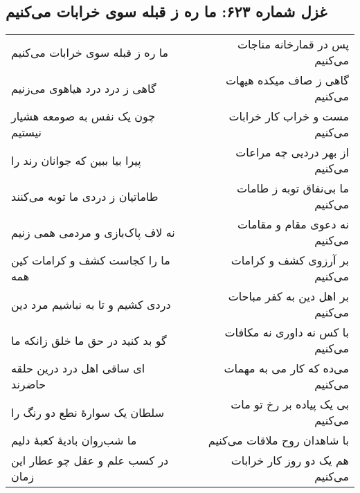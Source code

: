 \begin{center}
\section*{غزل شماره ۶۲۳: ما ره ز قبله سوی خرابات می‌کنیم}
\label{sec:623}
\begin{longtable}{l p{0.5cm} r}
ما ره ز قبله سوی خرابات می‌کنیم
&&
پس در قمارخانه مناجات می‌کنیم
\\
گاهی ز درد درد هیاهوی می‌زنیم
&&
گاهی ز صاف میکده هیهات می‌کنیم
\\
چون یک نفس به صومعه هشیار نیستیم
&&
مست و خراب کار خرابات می‌کنیم
\\
پیرا بیا ببین که جوانان رند را
&&
از بهر دردیی چه مراعات می‌کنیم
\\
طاماتیان ز دردی ما توبه می‌کنند
&&
ما بی‌نفاق توبه ز طامات می‌کنیم
\\
نه لاف پاک‌بازی و مردمی همی زنیم
&&
نه دعوی مقام و مقامات می‌کنیم
\\
ما را کجاست کشف و کرامات کین همه
&&
بر آرزوی کشف و کرامات می‌کنیم
\\
دردی کشیم و تا به نباشیم مرد دین
&&
بر اهل دین به کفر مباحات می‌کنیم
\\
گو بد کنید در حق ما خلق زانکه ما
&&
با کس نه داوری نه مکافات می‌کنیم
\\
ای ساقی اهل درد درین حلقه حاضرند
&&
می‌ده که کار می به مهمات می‌کنیم
\\
سلطان یک سوارهٔ نطع دو رنگ را
&&
بی یک پیاده بر رخ تو مات می‌کنیم
\\
ما شب‌روان بادیهٔ کعبهٔ دلیم
&&
با شاهدان روح ملاقات می‌کنیم
\\
در کسب علم و عقل چو عطار این زمان
&&
هم یک دو روز کار خرابات می‌کنیم
\\
\end{longtable}
\end{center}
